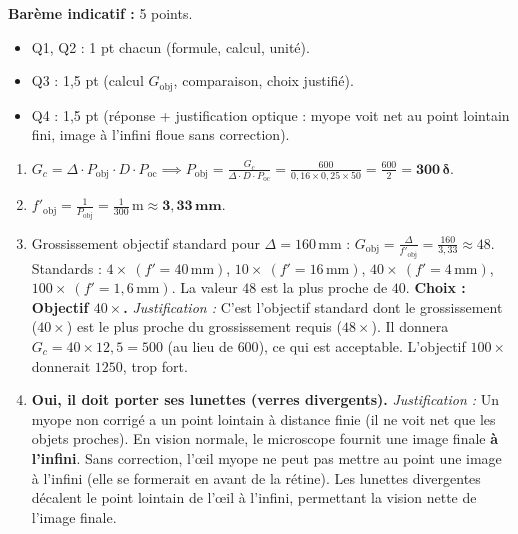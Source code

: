 \documentclass[11pt]{article}
\begin{document}
\begin{corrige}
\textbf{Barème indicatif :} 5 points.
\begin{itemize}
    \item Q1, Q2 : 1 pt chacun (formule, calcul, unité).
    \item Q3 : 1,5 pt (calcul $G_{\text{obj}}$, comparaison, choix justifié).
    \item Q4 : 1,5 pt (réponse + justification optique : myope voit net au point lointain fini, image à l'infini floue sans correction).
\end{itemize}

\begin{enumerate}
    \item $G_c = \Delta \cdot P_{\text{obj}} \cdot D \cdot P_{\text{oc}} \implies P_{\text{obj}} = \frac{G_c}{\Delta \cdot D \cdot P_{\text{oc}}} = \frac{600}{0,16 \times 0,25 \times 50} = \frac{600}{2} = \mathbf{300\,\delta}$.
    \item $f'_{\text{obj}} = \frac{1}{P_{\text{obj}}} = \frac{1}{300}\,\text{m} \approx \mathbf{3,33\,\text{mm}}$.
    \item Grossissement objectif standard pour $\Delta = 160\,\text{mm}$ : $G_{\text{obj}} = \frac{\Delta}{f'_{\text{obj}}} = \frac{160}{3,33} \approx 48$.
    Standards : $4\times\ (f'=40\,\text{mm})$, $10\times\ (f'=16\,\text{mm})$, $40\times\ (f'=4\,\text{mm})$, $100\times\ (f'=1,6\,\text{mm})$.
    La valeur $48$ est la plus proche de $40$.
    \textbf{Choix : Objectif $40\times$.}
    \emph{Justification :} C'est l'objectif standard dont le grossissement ($40\times$) est le plus proche du grossissement requis ($48\times$). Il donnera $G_c = 40 \times 12,5 = 500$ (au lieu de $600$), ce qui est acceptable. L'objectif $100\times$ donnerait $1250$, trop fort.
    \item \textbf{Oui, il doit porter ses lunettes (verres divergents).}
    \emph{Justification :} Un myope non corrigé a un point lointain à distance finie (il ne voit net que les objets proches). En vision normale, le microscope fournit une image finale \textbf{à l'infini}. Sans correction, l'œil myope ne peut pas mettre au point une image à l'infini (elle se formerait en avant de la rétine). Les lunettes divergentes décalent le point lointain de l'œil à l'infini, permettant la vision nette de l'image finale.
\end{enumerate}
\end{corrige}
\end{document}
